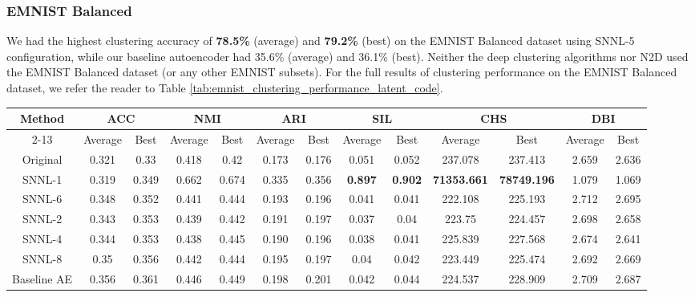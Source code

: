 \documentclass[conference]{IEEEtran}
\begin{document}
\subsubsection{EMNIST Balanced}
We had the highest clustering accuracy of \textbf{78.5\%} (average) and \textbf{79.2\%} (best) on the EMNIST Balanced dataset using SNNL-5 configuration, while our baseline autoencoder had 35.6\% (average) and 36.1\% (best). Neither the deep clustering algorithms nor N2D used the EMNIST Balanced dataset (or any other EMNIST subsets). For the full results of clustering performance on the EMNIST Balanced dataset, we refer the reader to Table \ref{tab:emnist_clustering_performance_latent_code}.
\begin{table*}[htb]
    \caption{Clustering Performance on the EMNIST-Balanced Dataset.}
    \label{tab:emnist_clustering_performance_latent_code}
    \centering
    \begin{tabular}{| *{13}{c|}}
        \hline
         \multirow{2}{*}{Method} & \multicolumn{2}{c|}{ACC} & \multicolumn{2}{c|}{NMI} & \multicolumn{2}{c|}{ARI} & \multicolumn{2}{c|}{SIL} & \multicolumn{2}{c|}{CHS} & \multicolumn{2}{c|}{DBI}\\
        \cline{2-13}
         & Average & Best & Average & Best & Average & Best & Average & Best & Average & Best & Average & Best \\ 
         \hline
         Original & 0.321 & 0.33 & 0.418 & 0.42 & 0.173 & 0.176 & 0.051 & 0.052 & 237.078 & 237.413 & 2.659 & 2.636\\
         \hline
         SNNL-1 & 0.319 & 0.349 & 0.662 & 0.674 & 0.335 & 0.356 & \textbf{0.897} & \textbf{0.902} & \textbf{71353.661} & \textbf{78749.196} & 1.079 & 1.069\\
         \hline
         SNNL-6 & 0.348 & 0.352 & 0.441 & 0.444 & 0.193 & 0.196 & 0.041 & 0.041 & 222.108 & 225.193 & 2.712 & 2.695\\
         \hline
         SNNL-2 & 0.343 & 0.353 & 0.439 & 0.442 & 0.191 & 0.197 & 0.037 & 0.04 & 223.75 & 224.457 & 2.698 & 2.658\\
         \hline
         SNNL-4 & 0.344 & 0.353 & 0.438 & 0.445 & 0.190 & 0.196 & 0.038 & 0.041 & 225.839 & 227.568 & 2.674 & 2.641\\
         \hline
         SNNL-8 & 0.35 & 0.356 & 0.442 & 0.444 & 0.195 & 0.197 & 0.04 & 0.042 & 223.449 & 225.474 & 2.692 & 2.669\\
        \hline
         Baseline AE & 0.356 & 0.361 & 0.446 & 0.449 & 0.198 & 0.201 & 0.042 & 0.044 & 224.537 & 228.909 & 2.709 & 2.687\\

\end{tabular}
\end{table*}
\end{document}
